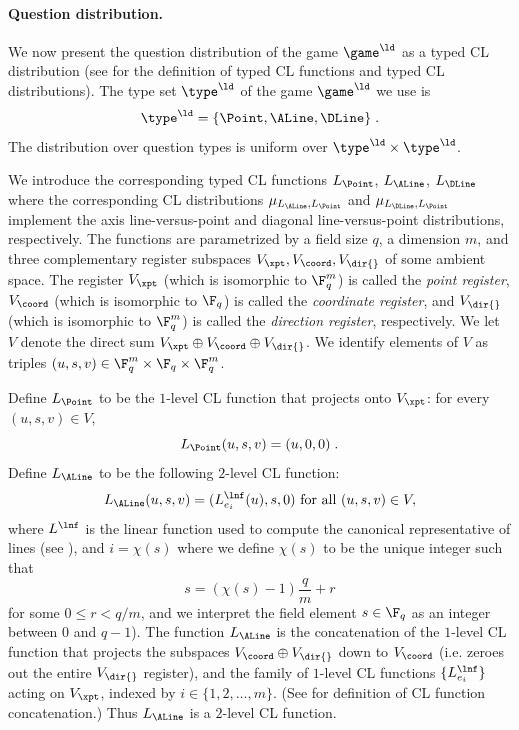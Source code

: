\paragraph{Question distribution.}
We now present the question distribution of the game $\game^\ld$ as a typed CL
distribution (see  for the definition of typed CL functions and
typed CL distributions).
The type set $\type^\ld$ of the game $\game^\ld$ we use is
\[
	\type^\ld = \{ \Point, \ALine, \DLine \}\;.
\]
The distribution over question types is uniform over $\type^\ld \times \type^\ld$. 

We introduce the corresponding typed CL functions $L_\Point$, $L_\ALine$,
$L_\DLine$ where the corresponding CL distributions $\mu_{L_\ALine,L_\Point}$
and $\mu_{L_\DLine,L_\Point}$ implement the axis line-versus-point and diagonal
line-versus-point distributions, respectively.
The functions are parametrized by a field size $q$, a dimension $m$, and three
complementary register subspaces $V_\xpt,V_{\coord}, V_{\dir{}}$ of some ambient
space.
The register $V_\xpt$ (which is isomorphic to $\F_q^m$) is called the
\emph{point register}, $V_\coord$ (which is isomorphic to $\F_q$) is called the
\emph{coordinate register}, and $V_{\dir{}}$ (which is isomorphic to $\F_q^m$)
is called the \emph{direction register}, respectively.
We let $V$ denote the direct sum $V_\xpt \oplus V_{\coord} \oplus V_{\dir{}}$.
We identify elements of $V$ as triples $(u,s,v) \in \F_q^m \times \F_q \times
\F_q^m$.

Define $L_\Point$ to be the $1$-level CL function that projects onto $V_\xpt$: for every $(u,s,v) \in V$,
\begin{equation}
  \label{eq:cl-ptf}
	L_\Point(u,s,v) = (u,0,0) \;.
\end{equation}
Define $L_\ALine$ to be the following $2$-level CL function:
\begin{equation}
  \label{eq:cl-alnf}
	L_\ALine(u,s,v) = (L^\lnf_{e_i}(u), s, 0)\ \text{for all } (u,s,v) \in V,
\end{equation}
where $L^\lnf$ is the linear function used to compute the canonical
representative of lines (see ), and $i = \chi(s)$
where we define $\chi(s)$ to be the unique integer such that
\begin{equation}
\label{eq:chi-func}
	s = (\chi(s) - 1) \frac{q}{m} + r
\end{equation}
for some $0 \leq r < q/m$, and we interpret the field element $s \in \F_q$ as an
integer between $0$ and $q - 1$).
The function $L_\ALine$ is the concatenation of the $1$-level CL function that
projects the subspaces $V_{\coord} \oplus V_{\dir{}}$ down to $V_\coord$ (i.e.
zeroes out the entire $V_{\dir{}}$ register), and the family of $1$-level CL
functions $\{L^\lnf_{e_i} \}$ acting on $V_\xpt$, indexed by $i \in
\{1,2,\ldots,m\}$.
(See  for definition of CL function concatenation.)
Thus $L_\ALine$ is a $2$-level CL function.


